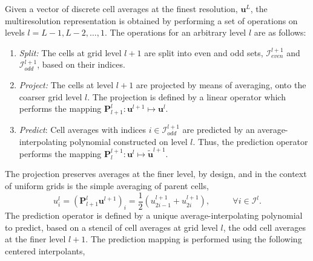 \documentclass[]{article}
\begin{document}
        Given a vector of discrete cell averages at the finest resolution,
        $\bm{u}^{L}$, the multiresolution representation is obtained by
        performing a set of operations on levels $l = L-1,L-2,\dots,1$.  The
        operations for an arbitrary level $l$ are as follows:
        \begin{enumerate}
            \item[] \textit{Split:} The cells at grid level $l+1$ are split into
                even and odd sets, $\bm{\mathcal{I}}_{even}^{l+1}$ and
                $\bm{\mathcal{I}}_{odd}^{l+1}$, based on their indices.
            \item[] \textit{Project:} The cells at level $l+1$ are projected
                by means of averaging, onto the coarser grid
                level $l$. The projection is defined by a linear operator
                which performs the mapping $\bm{P}_{l+1}^{l} : \bm{u}^{l+1}
                \mapsto \bm{u}^{l}$. 
            \item[] \textit{Predict}: Cell averages with indices $i \in
                \bm{\mathcal{I}}_{odd}^{l+1}$ are predicted by an
                average-interpolating polynomial constructed on level $l$.
                Thus, the prediction operator performs the mapping
                $\bm{P}_{l}^{l+1} : \bm{u}^{l} \mapsto \tilde{\bm{u}}^{l+1}$. 
        \end{enumerate}
        The projection preserves averages at the finer level, by design, and in
        the context of uniform grids is the simple averaging of parent cells,
        \begin{equation}
            u^{l}_{i} = \left( \bm{P}_{l+1}^{l} \bm{u}^{l+1} \right)_{i} = \frac{1}{2} ( u^{l+1}_{2i-1} + u^{l+1}_{2i} ), \text{ }
            \text{ } \text{ } \text{ } \forall i \in \bm{\mathcal{I}}^{l}.
        \end{equation}
        The prediction operator is defined by a unique average-interpolating
        polynomial to predict, based on a stencil of cell averages at grid level
        $l$, the odd cell averages at the finer level $l+1$. The prediction
        mapping is performed using the following centered interpolants,
\end{document}
